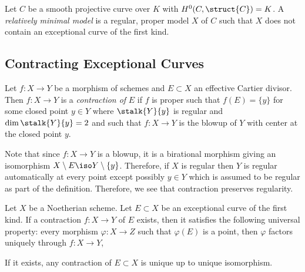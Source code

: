 \begin{definition}
Let $C$ be a smooth projective curve over $K$ with $H^0(C, \struct{C}) = K$. A \textit{relatively minimal model} is a regular, proper model $X$ of $C$ such that $X$ does not contain an exceptional curve of the first kind. 
\end{definition}

\subsection{Contracting Exceptional Curves}

\begin{defn}
Let $f : X \to Y$ be a morphism of schemes and $E \subset X$ an effective Cartier divisor. Then $f : X \to Y$ is a \textit{contraction of} $E$ if $f$ is proper such that $f(E) = \{ y \}$ for some closed point $y \in Y$ where $\stalk{Y}{y}$ is regular and $\dim{\stalk{Y}{y}} = 2$ and such that $f : X \to Y$ is the blowup of $Y$ with center at the closed point $y$.
\end{defn}

\begin{rmk}
Note that since $f : X \to Y$ is a blowup, it is a birational morphism giving an isomorphism $X \setminus E \iso Y \setminus \{ y \}$. Therefore, if $X$ is regular then $Y$ is regular automatically at every point except possibly $y \in Y$ which is assumed to be regular as part of the definition. Therefore, we see that contraction preserves regularity.
\end{rmk}

\begin{lemma}[0C5J]
Let $X$ be a Noetherian scheme. Let $E \subset X$ be an exceptional curve of the first kind. If a contraction $f : X \to Y$ of $E$ exists, then it satisfies the following universal property: every morphism $\varphi : X \to Z$ such that $\varphi(E)$ is a point, then $\varphi$ factors uniquely through $f : X \to Y$,
\begin{center}
\end{center}
\end{lemma}

\begin{corollary}
If it exists, any contraction of $E \subset X$ is unique up to unique isomorphism. 
\end{corollary}

